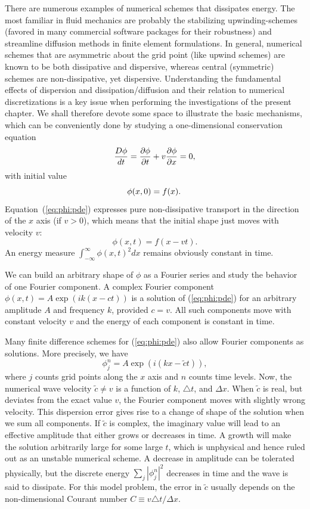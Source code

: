 There are numerous examples of numerical schemes that dissipates
energy. The most familiar in fluid mechanics are probably the
stabilizing upwinding-schemes (favored in many commercial software
packages for their robustness) and streamline diffusion methods in finite
element formulations. In general, numerical schemes that are asymmetric
about the grid point (like upwind schemes) are known to be both
dissipative and dispersive, whereas central (symmetric) schemes are
non-dissipative, yet dispersive. Understanding the fundamental effects
of dispersion and dissipation/diffusion and their relation to numerical
discretizations is a key issue when performing the investigations of
the present chapter. We shall therefore devote some space to illustrate
the basic mechanisms, which can be conveniently done by studying
a one-dimensional conservation equation
\begin{equation}
{D\phi\over dt} = {\partial\phi\over\partial t} + v{\partial\phi\over\partial x}
=0,
\label{eq:phi:pde}
\end{equation}
with initial value 
\[ \phi(x,0)=f(x) . \thinspace\]
Equation~(\ref{eq:phi:pde}) expresses pure non-dissipative transport
in the direction of the $x$ axis (if $v>0$), which means that the initial
shape just moves with velocity $v$: 
\[ \phi(x,t) = f(x-vt).\]
An energy measure $\int_{-\infty}^\infty\phi(x,t)^2dx$ remains obviously
constant in time.

We can build an arbitrary shape of $\phi$ as a Fourier
series and study the behavior of one Fourier component. 
A complex Fourier component
$\phi (x,t)=A\exp{(ik(x - ct))}$ is a solution of (\ref{eq:phi:pde})
for an arbitrary amplitude $A$ and frequency $k$, provided $c = v$.
All such components move
with constant velocity $v$ and the energy of each component is constant
in time.

Many finite difference schemes for (\ref{eq:phi:pde}) also allow
Fourier components as solutions. More precisely, we have 
\[ \phi_j^n = A\exp{(i(kx - \tilde c t))},\]
where $j$ counts grid points along the $x$ axis and $n$ counts time levels.
Now, the numerical wave velocity $\tilde c \neq v$ is a function of 
$k$, $\triangle t$, and $\Delta x$.
When $\tilde c$ is real,
but deviates from the exact value $v$, the Fourier component moves
with slightly wrong velocity. This dispersion error gives rise to a change
of shape of the solution when we sum all components.
If $\tilde c$ is complex, the imaginary value will lead to an effective
amplitude that either grows or decreases in time. A growth will
make the solution arbitrarily large for some large $t$, which is unphysical
and hence ruled out as an unstable numerical scheme.
A decrease in amplitude can be tolerated physically,
but the discrete energy $\sum_j |\phi_j^n|^2$ decreases in time and the
wave is said to dissipate.
For this model problem,
the error in $\tilde c$ usually depends on the non-dimensional
Courant number $C\equiv v\triangle t/\Delta x$. 

